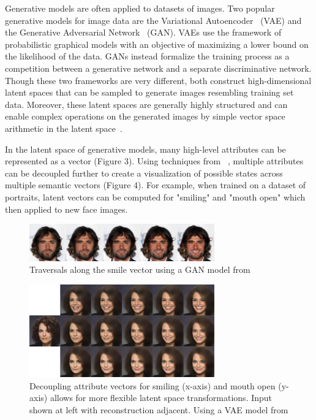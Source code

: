\documentclass[letterpaper]{article}
\begin{document}
Generative models are often applied to datasets of images. Two popular generative models for image data are the Variational Autoencoder~\cite{kingma13} (VAE) and the Generative Adversarial Network~\cite{goodfellow14} (GAN). VAEs use the framework of probabilistic graphical models with an objective of maximizing a lower bound on the likelihood of the data. GANs instead formalize the training process as a competition between a generative network and a separate discriminative network. Though these two frameworks are very different, both construct high-dimensional latent spaces that can be sampled to generate images resembling training set data. Moreover, these latent spaces are generally highly structured and can enable complex operations on the generated images by simple vector space arithmetic in the latent space~\cite{larsen15}.

In the latent space of generative models, many high-level attributes can be represented as a vector (Figure 3). Using techniques from ~\cite{white16}, multiple attributes can be decoupled further to create a visualization of possible states across multiple semantic vectors (Figure 4). For example, when trained on a dataset of portraits, latent vectors can be computed for "smiling" and "mouth open" which then applied to new face images.

\begin{figure}[ht]
  \centering
  \includegraphics[width=8cm]{figs/smilevector.png}
  \caption{Traversals along the smile vector using a GAN model from ~\cite{dumoulin16}}
\end{figure}

\begin{figure}[ht]
  \centering
  \includegraphics[width=8cm]{figs/decoupled.jpg}
  \caption{Decoupling attribute vectors for smiling (x-axis) and mouth open (y-axis) allows for more flexible latent space transformations. Input shown at left with reconstruction adjacent. Using a VAE model from ~\cite{lamb16}}
\end{figure}
\end{document}
